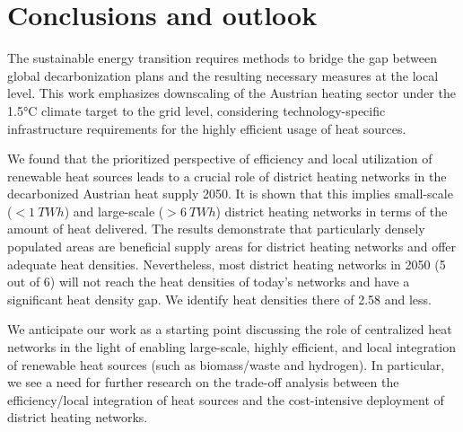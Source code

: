 \section{Conclusions and outlook}\label{conclusions}
The sustainable energy transition requires methods to bridge the gap between global decarbonization plans and the resulting necessary measures at the local level. This work emphasizes downscaling of the Austrian heating sector under the 1.5°C climate target to the grid level, considering technology-specific infrastructure requirements for the highly efficient usage of heat sources.\vspace{0.3cm}

We found that the prioritized perspective of efficiency and local utilization of renewable heat sources leads to a crucial role of district heating networks in the decarbonized Austrian heat supply 2050. It is shown that this implies small-scale ($<\SI{1}{TWh}$) and large-scale ($>\SI{6}{TWh}$) district heating networks in terms of the amount of heat delivered. The results demonstrate that particularly densely populated areas are beneficial supply areas for district heating networks and offer adequate heat densities. Nevertheless, most district heating networks in 2050 (5 out of 6) will not reach the heat densities of today's networks and have a significant heat density gap. We identify heat densities there of \SI{2.58}{} and less.\vspace{0.3cm}

We anticipate our work as a starting point discussing the role of centralized heat networks in the light of enabling large-scale, highly efficient, and local integration of renewable heat sources (such as biomass/waste and hydrogen). In particular, we see a need for further research on the trade-off analysis between the efficiency/local integration of heat sources and the cost-intensive deployment of district heating networks.  








